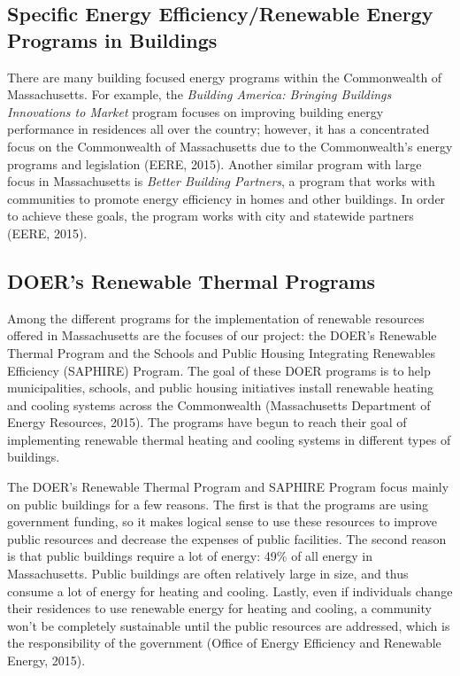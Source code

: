     \subsection{Specific Energy Efficiency/Renewable Energy Programs in Buildings}
    \par There are many building focused energy programs within the Commonwealth of Massachusetts. For example, the \emph{Building America: Bringing Buildings Innovations to Market}  program focuses on improving building energy performance in residences all over the country; however, it has a concentrated focus on the Commonwealth of Massachusetts due to the Commonwealth's energy programs and legislation (EERE, 2015). Another similar program with large focus in Massachusetts is \emph{Better Building Partners}, a program that works with communities to promote energy efficiency in homes and other buildings. In order to achieve these goals, the program works with city and statewide partners (EERE, 2015).

    \subsection{DOER's Renewable Thermal Programs}
    \par Among the different programs for the implementation of renewable resources offered in Massachusetts are the focuses of our project: the DOER's Renewable Thermal Program and the Schools and Public Housing Integrating Renewables Efficiency (SAPHIRE) Program. The goal of these DOER programs is to help municipalities, schools, and public housing initiatives install renewable heating and cooling systems across the Commonwealth (Massachusetts Department of Energy Resources, 2015). The programs have begun to reach their goal of implementing renewable thermal heating and cooling systems in different types of buildings. 
    \par The DOER's Renewable Thermal Program and SAPHIRE Program focus mainly on public buildings for a few reasons. The first is that the programs are using government funding, so it makes logical sense to use these resources to improve public resources and decrease the expenses of public facilities. The second reason is that public buildings require a lot of energy: 49\% of all energy in Massachusetts. Public buildings are often relatively large in size, and thus consume a lot of energy for heating and cooling. Lastly, even if individuals change their residences to use renewable energy for heating and cooling, a community won't be completely sustainable until the public resources are addressed, which is the responsibility of the government (Office of Energy Efficiency and Renewable Energy, 2015).

